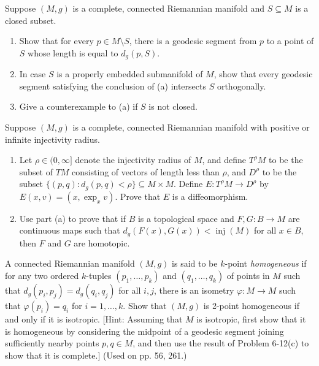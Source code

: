 \begin{exercise}
\label{prob:geodesic-to-closed-subset}

Suppose $(M, g)$ is a complete, connected Riemannian manifold and $S \subseteq M$ is a closed subset.
\begin{enumerate}
\item[(a)] Show that for every $p \in M \setminus S$, there is a geodesic segment from $p$ to a point of $S$ whose length is equal to $d_g(p, S)$.
\item[(b)] In case $S$ is a properly embedded submanifold of $M$, show that every geodesic segment satisfying the conclusion of (a) intersects $S$ orthogonally.
\item[(c)] Give a counterexample to (a) if $S$ is not closed.
\end{enumerate}
\end{exercise}

\begin{exercise}
\label{prob:inj-radius-diffeomorphism}

Suppose $(M, g)$ is a complete, connected Riemannian manifold with positive or infinite injectivity radius.
\begin{enumerate}
\item[(a)] Let $\rho \in (0, \infty]$ denote the injectivity radius of $M$, and define $T^\rho M$ to be the subset of $TM$ consisting of vectors of length less than $\rho$, and $D^\rho$ to be the subset $\{(p, q) : d_g(p, q) < \rho\} \subseteq M \times M$. Define $E : T^\rho M \to D^\rho$ by $E(x, v) = (x, \exp_x v)$. Prove that $E$ is a diffeomorphism.
\item[(b)] Use part (a) to prove that if $B$ is a topological space and $F, G : B \to M$ are continuous maps such that $d_g(F(x), G(x)) < \operatorname{inj}(M)$ for all $x \in B$, then $F$ and $G$ are homotopic.
\end{enumerate}
\end{exercise}

\begin{exercise}
\label{prob:k-point-homogeneous}

A connected Riemannian manifold $(M,g)$ is said to be $k$-point \emph{homogeneous} if for any two ordered $k$-tuples $(p_1,\ldots,p_k)$ and $(q_1,\ldots,q_k)$ of points in $M$ such that $d_g(p_i, p_j) = d_g(q_i,q_j)$ for all $i,j$, there is an isometry $\varphi: M \to M$ such that $\varphi(p_i) = q_i$ for $i = 1,\ldots,k$. Show that $(M,g)$ is 2-point homogeneous if and only if it is isotropic. [Hint: Assuming that $M$ is isotropic, first show that it is homogeneous by considering the midpoint of a geodesic segment joining sufficiently nearby points $p, q \in M$, and then use the result of Problem 6-12(c) to show that it is complete.] (Used on pp. 56, 261.)
\end{exercise}

